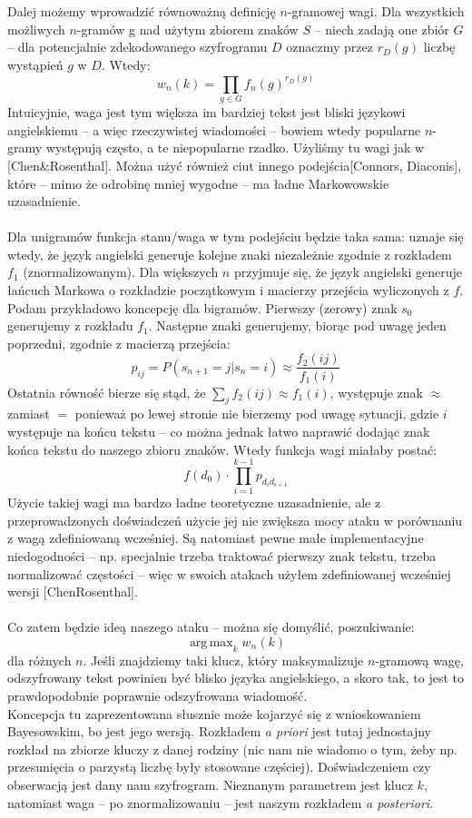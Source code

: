 \documentclass[a4paper]{article}
\DeclareMathOperator*{\argmax}{arg\,max}
\begin{document}
Dalej możemy wprowadzić równoważną definicję $n$-gramowej wagi. Dla wszystkich możliwych $n$-gramów g nad użytym zbiorem znaków $S$ – niech zadają one zbiór $G$ – dla potencjalnie zdekodowanego szyfrogramu $D$ oznaczmy przez $r_D(g)$ liczbę wystąpień $g$ w $D$. Wtedy:
$$w_n(k) = \prod\limits_{g \in G} f_n(g)^{r_D(g)}$$
Intuicyjnie, waga jest tym większa im bardziej tekst jest bliski językowi angielskiemu – a więc rzeczywistej wiadomości – bowiem wtedy popularne $n$-gramy występują często, a te niepopularne rzadko. Użyliśmy tu wagi jak w [Chen\&Rosenthal]. Można użyć również ciut innego podejścia[Connors, Diaconis], które – mimo że odrobinę mniej wygodne – ma ładne Markowowskie uzasadnienie.\\\\
Dla unigramów funkcja stanu/waga w tym podejściu będzie taka sama: uznaje się wtedy, że język angielski generuje kolejne znaki niezależnie zgodnie z rozkładem $f_1$ (znormalizowanym). Dla większych $n$ przyjmuje się, że język angielski generuje łańcuch Markowa o rozkładzie początkowym i macierzy przejścia wyliczonych z $f$. Podam przykładowo koncepcję dla bigramów. Pierwszy (zerowy) znak $s_0$ generujemy z rozkładu $f_1$. Następne znaki generujemy, biorąc pod uwagę jeden poprzedni, zgodnie z macierzą przejścia:
$$p_{ij} = P(s_{n+1} = j|s_n = i) \approx \frac{f_2(ij)}{f_1(i)}$$
Ostatnia równość bierze się stąd, że $\sum_j f_2(ij) \approx f_1(i)$, występuje znak $\approx$ zamiast $=$ ponieważ po lewej stronie nie bierzemy pod uwagę sytuacji, gdzie $i$ występuje na końcu tekstu – co można jednak łatwo naprawić dodając znak końca tekstu do naszego zbioru znaków. Wtedy funkcja wagi miałaby postać:
$$ f(d_0) \cdot \prod\limits_{i=1}^{k-1} p_{{d_i}{d_{i+1}}} $$
Użycie takiej wagi ma bardzo ładne teoretyczne uzasadnienie, ale z przeprowadzonych doświadczeń użycie jej nie zwiększa mocy ataku w porównaniu z wagą zdefiniowaną wcześniej. Są natomiast pewne małe implementacyjne niedogodności – np. specjalnie trzeba traktować pierwszy znak tekstu, trzeba normalizować częstości – więc w swoich atakach użyłem zdefiniowanej wcześniej wersji [ChenRosenthal].\\\\
Co zatem będzie ideą naszego ataku – można się domyślić, poszukiwanie:
$$ \argmax_k w_n(k) $$
dla różnych $n$. Jeśli znajdziemy taki klucz, który maksymalizuje $n$-gramową wagę, odszyfrowany tekst powinien być blisko języka angielskiego, a skoro tak, to jest to prawdopodobnie poprawnie odszyfrowana wiadomość.\\
Koncepcja tu zaprezentowana słusznie może kojarzyć się z wnioskowaniem Bayesowskim, bo jest jego wersją. Rozkładem \textit{a priori} jest tutaj jednostajny rozkład na zbiorze kluczy z danej rodziny (nic nam nie wiadomo o tym, żeby np. przesunięcia o parzystą liczbę były stosowane częściej). Doświadczeniem czy obserwacją jest dany nam szyfrogram. Nieznanym parametrem jest klucz $k$, natomiast waga – po znormalizowaniu – jest naszym rozkładem \textit{a posteriori}.\\
\end{document}
